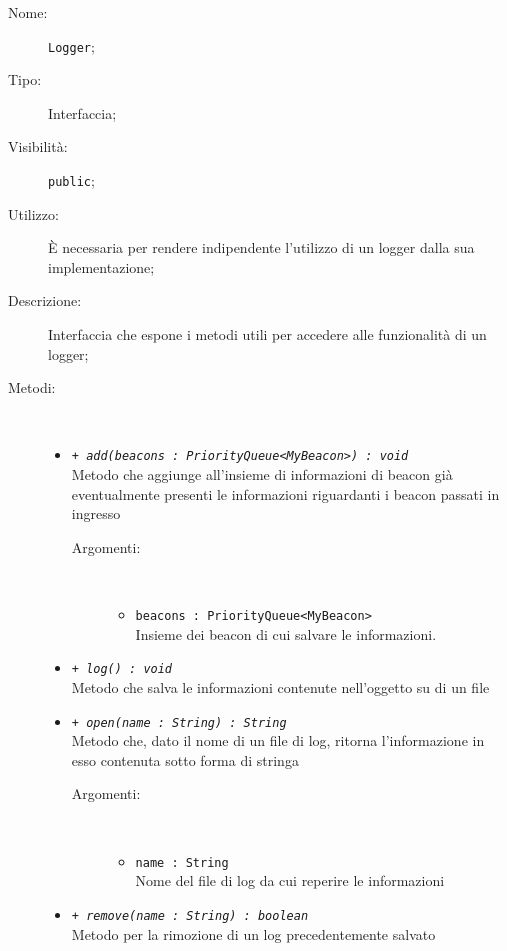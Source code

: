 \documentclass[../DefinizioneDiProdotto.tex]{subfiles}
\begin{document}
\begin{description}
	\item[Nome:] \texttt{Logger};
	\item[Tipo:] Interfaccia;
	\item[Visibilità:] \texttt{public};
	\item[Utilizzo:] È necessaria per rendere indipendente l'utilizzo di un logger dalla sua implementazione;
	\item[Descrizione:] Interfaccia che espone i metodi utili per accedere alle funzionalità di un logger;
	\item[Metodi:] \
	\begin{itemize}
		\item \texttt{+ \textit{add(beacons : PriorityQueue<MyBeacon>) : void}}\\
		Metodo che aggiunge all'insieme di informazioni di beacon già eventualmente presenti le informazioni riguardanti i beacon passati in ingresso
		\begin{description}
			\item[Argomenti:] \
			\begin{itemize}
				\item \texttt{beacons : PriorityQueue<MyBeacon>}\\
				Insieme dei beacon di cui salvare le informazioni.\end{itemize}
		\end{description}
		\item \texttt{+ \textit{log() : void}}\\
		Metodo che salva le informazioni contenute nell'oggetto su di un file
		\item \texttt{+ \textit{open(name : String) : String}}\\
		Metodo che, dato il nome di un file di log, ritorna l'informazione in esso contenuta sotto forma di stringa
		\begin{description}
			\item[Argomenti:] \
			\begin{itemize}
				\item \texttt{name : String}\\
				Nome del file di log da cui reperire le informazioni\end{itemize}
		\end{description}
		\item \texttt{+ \textit{remove(name : String) : boolean}}\\
		Metodo per la rimozione di un log precedentemente salvato
		\begin{description}

\end{description}
\end{itemize}
\end{description}
\end{document}
